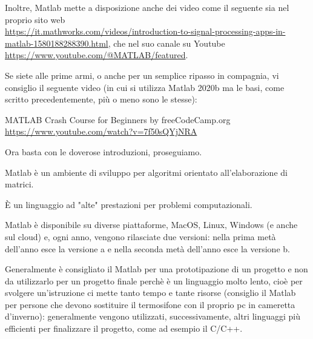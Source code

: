 \begin{tcolorbox}
    Inoltre, Matlab mette a disposizione anche dei video come il seguente sia nel proprio sito web \\ 
    \url{https://it.mathworks.com/videos/introduction-to-signal-processing-apps-in-matlab-1580188288390.html}, 
    che nel suo canale su Youtube \url{https://www.youtube.com/@MATLAB/featured}. \newline 

    Se siete alle prime armi, o anche per un semplice ripasso in compagnia, vi consiglio il seguente video (in cui si utilizza Matlab 2020b ma le basi, come scritto precedentemente, più o meno sono le stesse): \newline 

    MATLAB Crash Course for Beginners by freeCodeCamp.org \\ 
    \url{https://www.youtube.com/watch?v=7f50sQYjNRA} \newline 

    
    Ora basta con le doverose introduzioni, proseguiamo. 
\end{tcolorbox}

Matlab è un ambiente di sviluppo per algoritmi orientato all'elaborazione di matrici. \newline 

È un linguaggio ad "alte" prestazioni per problemi computazionali. \newline 

Matlab è disponibile su diverse piattaforme, MacOS, Linux, Windows (e anche sul cloud) e, ogni anno, 
vengono rilasciate due versioni: nella prima metà dell'anno esce la versione a e nella seconda metà dell'anno esce la versione b. \newline 

Generalmente è consigliato il Matlab per una prototipazione di un progetto e non da utilizzarlo per un progetto finale perchè è un linguaggio molto lento, 
cioè per svolgere un'istruzione ci mette tanto tempo e tante risorse (consiglio il Matlab per persone che devono sostituire il termosifone con il proprio pc in cameretta d'inverno): 
generalmente vengono utilizzati, successivamente, altri linguaggi più efficienti per finalizzare il progetto, come ad esempio il C/C++. \newline 

